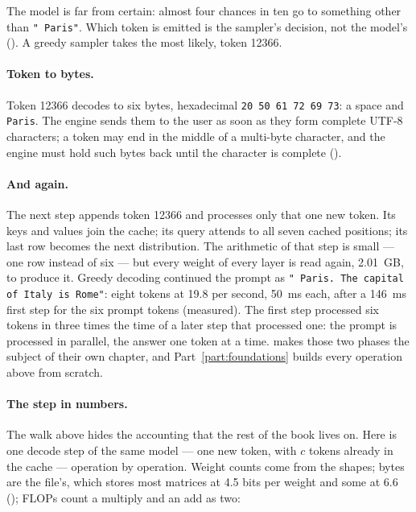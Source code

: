 \noindent The model is far from certain: almost four chances in ten go to
something other than \texttt{" Paris"}. Which token is emitted is the
sampler's decision, not the model's (). A greedy sampler takes
the most likely, token 12366.

\paragraph{Token to bytes.} Token 12366 decodes to six bytes, hexadecimal
\texttt{20 50 61 72 69 73}: a space and \texttt{Paris}. The engine sends them
to the user as soon as they form complete UTF-8 characters; a token may end in
the middle of a multi-byte character, and the engine must hold such bytes back
until the character is complete ().

\paragraph{And again.} The next step appends token 12366 and processes only
that one new token. Its keys and values join the cache; its query attends to
all seven cached positions; its last row becomes the next distribution. The
arithmetic of that step is small --- one row instead of six --- but every weight
of every layer is read again, 2.01~GB, to produce it. Greedy decoding continued
the prompt as \texttt{" Paris. The capital of Italy is Rome"}: eight tokens at
19.8 per second, 50~ms each, after a 146~ms first step for the six prompt
tokens (measured). The first step processed six tokens in three times the time
of a later step that processed one: the prompt is processed in parallel, the
answer one token at a time.  makes those two phases the
subject of their own chapter, and Part~\ref{part:foundations} builds every
operation above from scratch.

\paragraph{The step in numbers.} The walk above hides the accounting that the
rest of the book lives on. Here is one decode step of the same model --- one new
token, with $c$ tokens already in the cache --- operation by operation. Weight
counts come from the shapes; bytes are the file's, which stores most matrices at
4.5 bits per weight and some at 6.6 (); FLOPs count
a multiply and an add as two:

